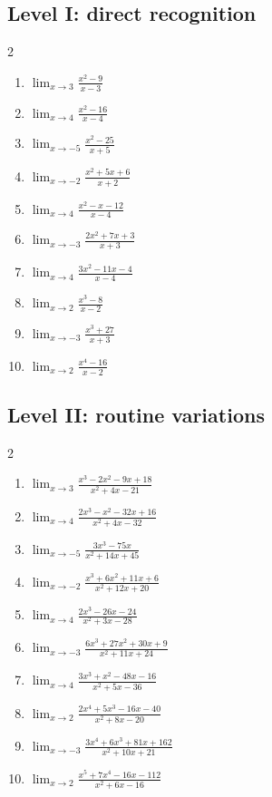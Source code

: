 \documentclass[11pt,oneside]{book}
\begin{document}
\subsection*{Level I: direct recognition}
\begin{multicols}{2}
\begin{enumerate}[leftmargin=*,label=\textbf{\arabic*.},itemsep=0.65\baselineskip]
\item $\displaystyle \lim_{x \to 3} \frac{x^{2} - 9}{x - 3}$
\item $\displaystyle \lim_{x \to 4} \frac{x^{2} - 16}{x - 4}$
\item $\displaystyle \lim_{x \to -5} \frac{x^{2} - 25}{x + 5}$
\item $\displaystyle \lim_{x \to -2} \frac{x^{2} + 5 x + 6}{x + 2}$
\item $\displaystyle \lim_{x \to 4} \frac{x^{2} - x - 12}{x - 4}$
\item $\displaystyle \lim_{x \to -3} \frac{2 x^{2} + 7 x + 3}{x + 3}$
\item $\displaystyle \lim_{x \to 4} \frac{3 x^{2} - 11 x - 4}{x - 4}$
\item $\displaystyle \lim_{x \to 2} \frac{x^{3} - 8}{x - 2}$
\item $\displaystyle \lim_{x \to -3} \frac{x^{3} + 27}{x + 3}$
\item $\displaystyle \lim_{x \to 2} \frac{x^{4} - 16}{x - 2}$
\end{enumerate}
\end{multicols}
\subsection*{Level II: routine variations}
\begin{multicols}{2}
\begin{enumerate}[leftmargin=*,label=\textbf{\arabic*.},itemsep=0.65\baselineskip]
\item $\displaystyle \lim_{x \to 3} \frac{x^{3} - 2 x^{2} - 9 x + 18}{x^{2} + 4 x - 21}$
\item $\displaystyle \lim_{x \to 4} \frac{2 x^{3} - x^{2} - 32 x + 16}{x^{2} + 4 x - 32}$
\item $\displaystyle \lim_{x \to -5} \frac{3 x^{3} - 75 x}{x^{2} + 14 x + 45}$
\item $\displaystyle \lim_{x \to -2} \frac{x^{3} + 6 x^{2} + 11 x + 6}{x^{2} + 12 x + 20}$
\item $\displaystyle \lim_{x \to 4} \frac{2 x^{3} - 26 x - 24}{x^{2} + 3 x - 28}$
\item $\displaystyle \lim_{x \to -3} \frac{6 x^{3} + 27 x^{2} + 30 x + 9}{x^{2} + 11 x + 24}$
\item $\displaystyle \lim_{x \to 4} \frac{3 x^{3} + x^{2} - 48 x - 16}{x^{2} + 5 x - 36}$
\item $\displaystyle \lim_{x \to 2} \frac{2 x^{4} + 5 x^{3} - 16 x - 40}{x^{2} + 8 x - 20}$
\item $\displaystyle \lim_{x \to -3} \frac{3 x^{4} + 6 x^{3} + 81 x + 162}{x^{2} + 10 x + 21}$
\item $\displaystyle \lim_{x \to 2} \frac{x^{5} + 7 x^{4} - 16 x - 112}{x^{2} + 6 x - 16}$
\end{enumerate}
\end{multicols}
\end{document}
